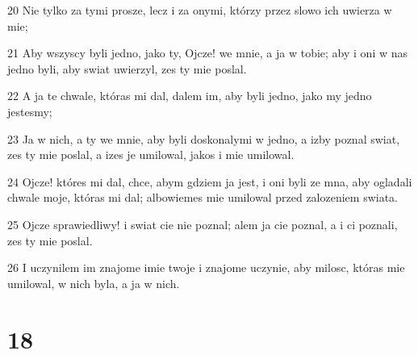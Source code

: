 \par 20 Nie tylko za tymi prosze, lecz i za onymi, którzy przez slowo ich uwierza w mie;
\par 21 Aby wszyscy byli jedno, jako ty, Ojcze! we mnie, a ja w tobie; aby i oni w nas jedno byli, aby swiat uwierzyl, zes ty mie poslal.
\par 22 A ja te chwale, któras mi dal, dalem im, aby byli jedno, jako my jedno jestesmy;
\par 23 Ja w nich, a ty we mnie, aby byli doskonalymi w jedno, a izby poznal swiat, zes ty mie poslal, a izes je umilowal, jakos i mie umilowal.
\par 24 Ojcze! któres mi dal, chce, abym gdziem ja jest, i oni byli ze mna, aby ogladali chwale moje, któras mi dal; albowiemes mie umilowal przed zalozeniem swiata.
\par 25 Ojcze sprawiedliwy! i swiat cie nie poznal; alem ja cie poznal, a i ci poznali, zes ty mie poslal.
\par 26 I uczynilem im znajome imie twoje i znajome uczynie, aby milosc, któras mie umilowal, w nich byla, a ja w nich.

\chapter{18}

